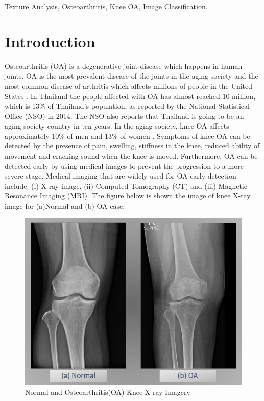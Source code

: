 \documentclass[review]{elsarticle}
\begin{document}
\begin{frontmatter}
		\begin{keyword}
			Texture Analysis, Osteoarthritis, Knee OA, Image Classification.
		\end{keyword}
		
	\end{frontmatter}
	
	\linenumbers
\section{Introduction}

Osteoarthritis (OA) is a degenerative joint disease which happens in human joints. OA is the most prevalent disease of the joints in the aging society and the most common disease of arthritis which affects millions of people in the United States \cite{Factors2000}. In Thailand the people affected with OA has almost reached 10 million, which is 13\% of Thailand's population, as reported by the National Statistical Office (NSO) in 2014. The NSO also reports that Thailand is going to be an aging society country in ten years. In the aging society, knee OA affects approximately 10\% of men and 13\% of women \cite{BoneandJointInitiativeUSA2014}. Symptoms of knee OA can be detected by the presence of pain, swelling, stiffness in the knee, reduced ability of movement and cracking sound when the knee is moved. Furthermore, OA can be detected early by using medical images to prevent the progression to a more severe stage. Medical imaging that are widely used for OA early detection include: (i) X-ray image, (ii) Computed Tomography (CT) and (iii) Magnetic Resonance Imaging (MRI). The figure below is shown the image of knee X-ray image for (a)Normal and (b) OA case: \\
\begin{figure}[h]
	\centering
	\includegraphics[width=0.7\linewidth]{pic/picOA}
	\caption{Normal and Osteoarthritis(OA) Knee X-ray Imagery}
	\label{fig:picoa}
\end{figure}
\end{document}
